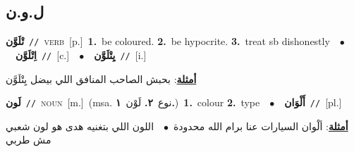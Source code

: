 \documentclass[10pt,a4paper,twoside]{article} %
\begin{document}
\begin{multicols}{2}
\vspace{-3mm}
\subsection*{\color{blue}\foreignlanguage{arabic}{ل.و.ن}\color{blue}{}} 

{\setlength\topsep{0pt}\textbf{\foreignlanguage{arabic}{تْلَوَّن}}\ {\color{gray}\texttt{//}\color{black}}\ \textsc{verb}\ [p.]\ \textbf{1.}~be coloured.  \textbf{2.}~be hypocrite.  \textbf{3.}~treat sb dishonestly\ \ $\bullet$\ \ \setlength\topsep{0pt}\textbf{\foreignlanguage{arabic}{اِتْلَوَّن}}\ {\color{gray}\texttt{//}\color{black}}\ [c.]\ \ $\bullet$\ \ \setlength\topsep{0pt}\textbf{\foreignlanguage{arabic}{يِتْلَوَّن}}\ {\color{gray}\texttt{//}\color{black}}\ [i.]\  \begin{flushright}\color{gray}\foreignlanguage{arabic}{\textbf{\underline{\foreignlanguage{arabic}{أمثلة}}}: بحبش الصاحب المنافق اللي بيضل يِتْلَوَّن}\end{flushright}\color{black}} \vspace{2mm}

{\setlength\topsep{0pt}\textbf{\foreignlanguage{arabic}{لَون}}\ {\color{gray}\texttt{//}\color{black}}\ \textsc{noun}\ [m.]\ \color{gray}(msa. \foreignlanguage{arabic}{نوع}~\foreignlanguage{arabic}{\textbf{٢.}}  \foreignlanguage{arabic}{لَوْن}~\foreignlanguage{arabic}{\textbf{١.}})\color{black}\ \textbf{1.}~colour  \textbf{2.}~type\ \ $\bullet$\ \ \setlength\topsep{0pt}\textbf{\foreignlanguage{arabic}{أَلْوَان}}\ {\color{gray}\texttt{//}\color{black}}\ [pl.]\  \begin{flushright}\color{gray}\foreignlanguage{arabic}{\textbf{\underline{\foreignlanguage{arabic}{أمثلة}}}: ألْوان السيارات عنا برام الله محدودة\ $\bullet$\ \  اللون اللي بتغنيه هدى هو لون شعبي مش طربي}\end{flushright}\color{black}} \vspace{2mm}


\end{multicols}
\end{document}
